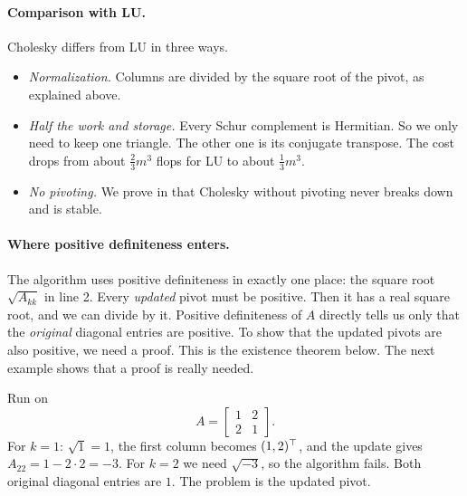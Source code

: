 \paragraph{Comparison with LU.} Cholesky differs from LU in three ways.
\begin{itemize}
  \item \emph{Normalization.} Columns are divided by the square root of the pivot, as explained above.
  \item \emph{Half the work and storage.} Every Schur complement is Hermitian. So we only need to keep one triangle. The other one is its conjugate transpose. The cost drops from about $\frac{2}{3}m^3$ flops for LU to about $\frac{1}{3}m^3$.
  \item \emph{No pivoting.} We prove in  that Cholesky without pivoting never breaks down and is stable.
\end{itemize}

\paragraph{Where positive definiteness enters.} The algorithm uses positive definiteness in exactly one place: the square root $\sqrt{A_{kk}}$ in line 2. Every \emph{updated} pivot must be positive. Then it has a real square root, and we can divide by it. Positive definiteness of $A$ directly tells us only that the \emph{original} diagonal entries are positive. To show that the updated pivots are also positive, we need a proof. This is the existence theorem below. The next example shows that a proof is really needed.

\begin{example}
  Run  on
  \begin{equation}
    A = \begin{bmatrix} 1 & 2 \\ 2 & 1 \end{bmatrix}.
  \end{equation}
  For $k = 1$: $\sqrt{1} = 1$, the first column becomes $(1, 2)^\top$, and the update gives $A_{22} = 1 - 2 \cdot 2 = -3$. For $k = 2$ we need $\sqrt{-3}$, so the algorithm fails. Both original diagonal entries are $1$. The problem is the updated pivot.
\end{example}

